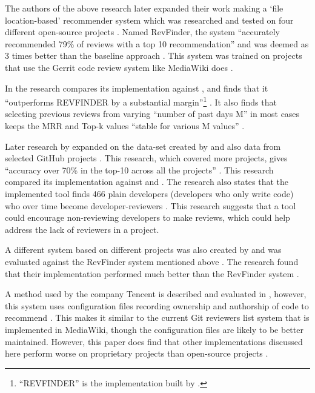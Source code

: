 The authors of the above research later expanded their work making a `file location-based' recommender system which was researched and tested on four different open-source projects \citep[p. 141]{7081824}. Named RevFinder, the system \enquote{accurately recommended 79\% of reviews with a top 10 recommendation} and was deemed as 3 times better than the baseline approach \citep[p. 141]{7081824}. This system was trained on projects that use the Gerrit code review system \citep[p. 142]{7081824} like MediaWiki does .

In \cite{7332472} the research compares its implementation against \cite{7081824}, and finds that it \enquote{outperforms REVFINDER by a substantial margin}\footnote{``REVFINDER'' is the implementation built by \cite{7081824}.} \citep[p. 266]{7332472}. It also finds that selecting previous reviews from varying \enquote{number of past days M} in most cases keeps the MRR and Top-k values \enquote{stable for various M values} \citep[p. 268]{7332472}.

Later research by \cite{9240650} expanded on the data-set created by \cite{7081824} and also data from selected GitHub projects \citep[p. 501]{9240650}. This research, which covered more projects, gives \enquote{accuracy over 70\% in the top-10 across all the projects} \citep[p. 507]{9240650}. This research compared its implementation against \cite{7081824} and \cite{7332472}. The research also states that the implemented tool finds 466 plain developers (developers who only write code) who over time become developer-reviewers \citep[p. 507]{9240650}. This research suggests that a tool could encourage non-reviewing developers to make reviews, which could help address the lack of reviewers in a project.

A different system based on different projects was also created by \citeauthor{7328331} and was evaluated against the RevFinder system mentioned above \citep[p. 536]{7328331}. The research found that their implementation performed much better than the RevFinder system \citep[p. 539]{7328331}.

A method used by the company Tencent is described and evaluated in \citeauthor{10.1145/3510457.3513035}, however, this system uses configuration files recording ownership and authorship of
code to recommend \citep[p. 117]{10.1145/3510457.3513035}. This makes it similar to the current Git reviewers list system that is implemented in MediaWiki, though the configuration files are likely to be better maintained. However, this paper does find that other implementations discussed here perform worse on
proprietary projects than open-source projects \citep[p. 120]{10.1145/3510457.3513035}.

